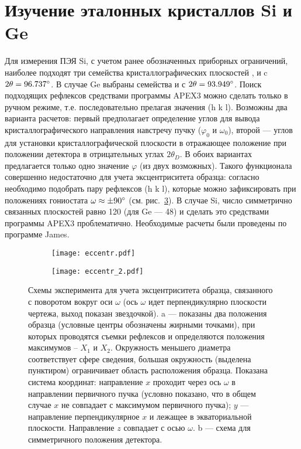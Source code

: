 \section{Изучение эталонных кристаллов Si и Ge}

Для измерения ПЭЯ Si, с учетом ранее обозначенных приборных ограничений, наиболее подходят три семейства кристаллографических плоскостей ,  и  c $2\theta = 96.737^\circ$.
В случае Ge выбраны семейства  и  с $2\theta = 93.949^\circ$.
Поиск подходящих рефлексов средствами программы APEX3 можно сделать только в ручном режиме, т.е. последовательно прелагая значения \hkl(h k l).
Возможны два варианта расчетов: первый предполагает определение углов для вывода кристаллографического направления навстречу пучку ($\varphi_0$ и $\omega_0$), второй --- углов для установки кристаллографической плоскости в отражающее положение при положении детектора в отрицательных углах $2\theta_D$.
В обоих вариантах предлагается только одно значение $\varphi$ (из двух возможных).
Такого функционала совершенно недостаточно для учета эксцентриситета образца: согласно~\cite{Ponomarev:1969} необходимо подобрать пару рефлексов \hkl(h k l), которые можно зафиксировать при положениях гониостата $\omega \approx \pm 90^\circ$ (см. рис.~\ref{fig:eccentr}).
В случае Si, число симметрично связанных плоскостей равно 120 (для Ge –-- 48) и сделать это средствами программы APEX3 проблематично.
Необходимые расчеты были проведены по программе James.

\begin{figure}[ht!]
    \centering
    \begin{subfigure}{0.5\textwidth}
    \centering
    \texttt{[image: eccentr.pdf]}
    \caption{}%
    \label{fig:eccentr_neg}
    \end{subfigure}%
    \begin{subfigure}{0.5\textwidth}
    \centering
    \texttt{[image: eccentr\_2.pdf]}
    \caption{}%
    \label{fig:eccentr_pos}
    \end{subfigure}
    \caption{
        Схемы эксперимента для учета эксцентриситета образца, связанного с поворотом вокруг оси $\omega$ (ось $\omega$ идет перпендикулярно плоскости чертежа, выход показан звездочкой).
        a --- показаны два положения образца (условные центры обозначены жирными точками), при которых проводятся съемки рефлексов и определяются положения максимумов – $X_1$ и $X_2$.
        Окружность меньшего диаметра соответствует сфере сведения, большая окружность (выделена пунктиром) ограничивает область расположения образца.
        Показана система координат: направление $x$ проходит через ось $\omega$ в направлении первичного пучка (условно показано, что в общем случае $x$ не совпадает с максимумом первичного пучка);
        $y$ --- направление перпендикулярное $x$ и лежащее в экваториальной плоскости.
        Направление $z$ совпадает с осью $\omega$.
        b --- схема для симметричного положения детектора.
    }%
    \label{fig:eccentr}
\end{figure}

